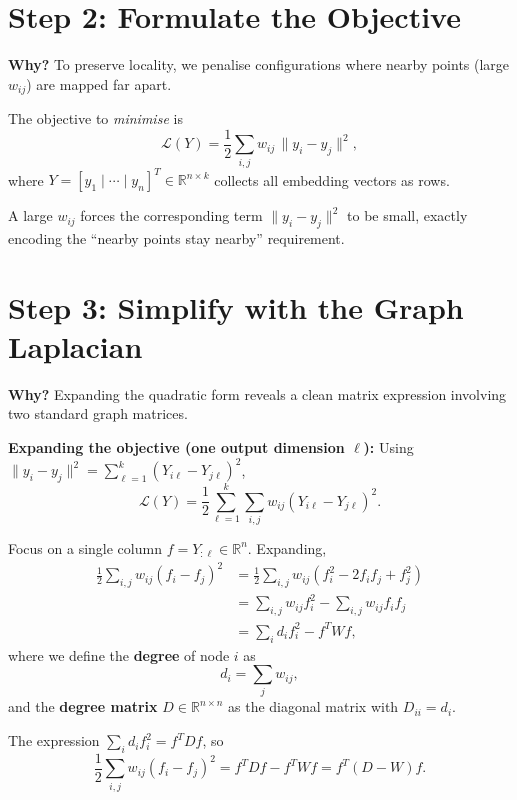 \documentclass[11pt]{article}
\begin{document}
\section*{Step 2: Formulate the Objective}

\textbf{Why?} To preserve locality, we penalise configurations where
nearby points (large $w_{ij}$) are mapped far apart.

The objective to \emph{minimise} is
\[
  \boxed{\mathcal{L}(Y) = \frac{1}{2}\sum_{i,j} w_{ij}\,\|y_i - y_j\|^2,}
\]
where $Y = [y_1 \mid \cdots \mid y_n]^T \in \mathbb{R}^{n \times k}$
collects all embedding vectors as rows.

A large $w_{ij}$ forces the corresponding term $\|y_i-y_j\|^2$ to be
small, exactly encoding the ``nearby points stay nearby'' requirement.

\section*{Step 3: Simplify with the Graph Laplacian}

\textbf{Why?} Expanding the quadratic form reveals a clean matrix
expression involving two standard graph matrices.

\textbf{Expanding the objective (one output dimension $\ell$):}
Using $\|y_i - y_j\|^2 = \sum_{\ell=1}^k (Y_{i\ell}-Y_{j\ell})^2$,
\[
  \mathcal{L}(Y)
  = \frac{1}{2}\sum_{\ell=1}^{k}\sum_{i,j} w_{ij}(Y_{i\ell}-Y_{j\ell})^2.
\]

Focus on a single column $f = Y_{:\ell} \in \mathbb{R}^n$.
Expanding,
\begin{align*}
  \frac{1}{2}\sum_{i,j}w_{ij}(f_i-f_j)^2
  &= \frac{1}{2}\sum_{i,j}w_{ij}(f_i^2 - 2f_if_j + f_j^2)\\
  &= \sum_{i,j}w_{ij}f_i^2 - \sum_{i,j}w_{ij}f_if_j\\
  &= \sum_i d_i f_i^2 - f^T W f,
\end{align*}
where we define the \textbf{degree} of node $i$ as
\[
  d_i = \sum_j w_{ij},
\]
and the \textbf{degree matrix} $D \in \mathbb{R}^{n\times n}$ as the
diagonal matrix with $D_{ii} = d_i$.

The expression $\sum_i d_i f_i^2 = f^T D f$, so
\[
  \frac{1}{2}\sum_{i,j}w_{ij}(f_i-f_j)^2 = f^T D f - f^T W f = f^T (D - W) f.
\]
\end{document}
